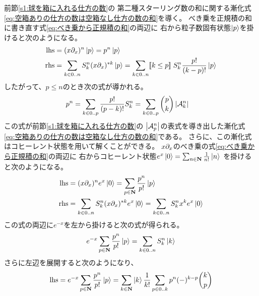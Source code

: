 	前節\ref{s1:球を箱に入れる仕方の数}の
	第二種スターリング数の和に関する漸化式
	\eqref{eq:空箱ありの仕方の数は空箱なし仕方の数の和}を導く。
	べき乗を正規積の和に書き直す式\eqref{eq:べき乗から正規積の和}の両辺に
	右から粒子数固有状態$\mathinner{|{p}\rangle}$を掛けると次のようになる。
	\begin{equation*}\begin{split} %
		\text{lhs} &= (\xdx{x}{})^n\ket{p} = p^n\ket{p} \\
		\text{rhs} &= \sum_{k\in0..n}S_k^n(\xdx{x}{})^{*k}\ket{p}
		= \sum_{k\in0..n}\jump{k\le p}S_k^n\frac{p!}{(k-p)!}\ket{p}
	\end{split}\end{equation*} %
	したがって、$p\le n$のとき次の式が導かれる。
	\begin{equation*}\begin{split} %
		p^n &= \sum_{k\in0..p}\frac{p!}{(p-k)!}S_k^n
		= \sum_{k\in0..p}\binom{p}{k}\zettai{\mycal{A}_k^n}
	\end{split}\end{equation*} %
	この式が前節\ref{s1:球を箱に入れる仕方の数}の
	$\left|{{{\mathcal{A}}}_p^n}\right|$の表式を導き出した漸化式
	\eqref{eq:空箱ありの仕方の数は空箱なし仕方の数の和}である。
	さらに、この漸化式はコヒーレント状態を用いて解くことができる。
	${x}{}\partial_{x}$のべき乗の式\eqref{eq:べき乗から正規積の和}の両辺に
	右からコヒーレント状態$e^{x}\mathinner{|{0}\rangle}=\sum_{n\in\mathbf{N}}\frac{1}{n!}\mathinner{|{n}\rangle}$
	を掛けると次のようになる。
	\begin{equation*}\begin{split} %
		\text{lhs} &= (\xdx{x}{})^ne^{x}\ket{0}
		= \sum_{p\in\sizen}\frac{p^n}{p!}\ket{p} \\
		\text{rhs} &= \sum_{k\in0..n}S_k^n(\xdx{x}{})^{*k}e^{x}\ket{0}
		= \sum_{k\in0..n}S_k^nx^ke^{x}\ket{0}
	\end{split}\end{equation*} %
	この式の両辺に$e^{-x}$を左から掛けると次の式が得られる。
	\begin{equation*}\begin{split} %
		e^{-x}\sum_{p\in\sizen}\frac{p^n}{p!}\ket{p}
		= \sum_{k\in0..n}S_k^n\ket{k}
	\end{split}\end{equation*} %
	さらに左辺を展開すると次のようになり、
	\begin{equation*}\begin{split} %
		\text{lhs} &= e^{-x}\sum_{p\in\sizen}\frac{p^n}{p!}\ket{p}
		= \sum_{k\in\sizen}\ket{k}\frac{1}{k!}
			\sum_{p\in0..k}p^n(-)^{k-p}\binom{k}{p} \\
	\end{split}\end{equation*} %
